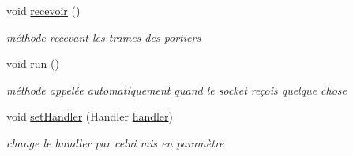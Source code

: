 \begin{DoxyCompactItemize}
void \hyperlink{classcom_1_1lasalle_1_1meeting_1_1_communication_a0344b79faa04dded3468fb8dda6baa81}{recevoir} ()
\begin{DoxyCompactList}\small\item\em méthode recevant les trames des portiers \end{DoxyCompactList}\item 
void \hyperlink{classcom_1_1lasalle_1_1meeting_1_1_communication_afe29bde1b4538990bd0a8c9b2d512efa}{run} ()
\begin{DoxyCompactList}\small\item\em méthode appelée automatiquement quand le socket reçois quelque chose \end{DoxyCompactList}\item 
void \hyperlink{classcom_1_1lasalle_1_1meeting_1_1_communication_a872d98a1793108557acccd0e695892af}{set\+Handler} (Handler \hyperlink{classcom_1_1lasalle_1_1meeting_1_1_communication_a05fa5f360f28819a9e106e0265a74643}{handler})
\begin{DoxyCompactList}\small\item\em change le handler par celui mis en paramètre \end{DoxyCompactList}\end{DoxyCompactItemize}
